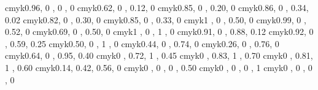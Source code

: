 \definecolor{processblue}   {cmyk}{0.96, 0   , 0   , 0   }
\definecolor{skyblue}       {cmyk}{0.62, 0   , 0.12, 0   }
\definecolor{turquoise}     {cmyk}{0.85, 0   , 0.20, 0   }
\definecolor{tealblue}      {cmyk}{0.86, 0   , 0.34, 0.02}
\definecolor{aquamarine}    {cmyk}{0.82, 0   , 0.30, 0   }
\definecolor{bluegreen}     {cmyk}{0.85, 0   , 0.33, 0   }
\definecolor{emerald}       {cmyk}{1   , 0   , 0.50, 0   }
\definecolor{junglegreen}   {cmyk}{0.99, 0   , 0.52, 0   }
\definecolor{seagreen}      {cmyk}{0.69, 0   , 0.50, 0   }
\definecolor{green}         {cmyk}{1   , 0   , 1   , 0   }
\definecolor{forestgreen}   {cmyk}{0.91, 0   , 0.88, 0.12}
\definecolor{pinegreen}     {cmyk}{0.92, 0   , 0.59, 0.25}
\definecolor{limegreen}     {cmyk}{0.50, 0   , 1   , 0   }
\definecolor{yellowgreen}   {cmyk}{0.44, 0   , 0.74, 0   }
\definecolor{springgreen}   {cmyk}{0.26, 0   , 0.76, 0   }
\definecolor{olivegreen}    {cmyk}{0.64, 0   , 0.95, 0.40}
\definecolor{rawsienna}     {cmyk}{0   , 0.72, 1   , 0.45}
\definecolor{sepia}         {cmyk}{0   , 0.83, 1   , 0.70}
\definecolor{brown}         {cmyk}{0   , 0.81, 1   , 0.60}
\definecolor{tan}           {cmyk}{0.14, 0.42, 0.56, 0   }
\definecolor{gray}          {cmyk}{0   , 0   , 0   , 0.50}
\definecolor{black}         {cmyk}{0   , 0   , 0   , 1   }
\definecolor{white}         {cmyk}{0   , 0   , 0   , 0   } 

